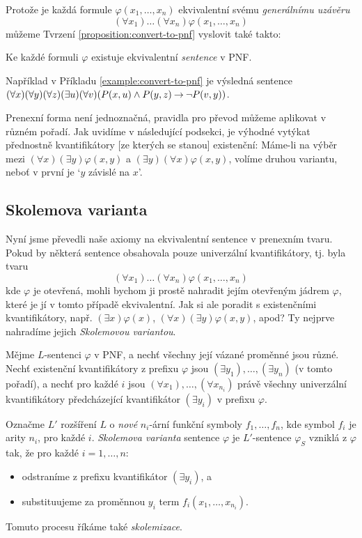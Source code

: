 Protože je každá formule $\varphi(x_1,\dots,x_n)$ ekvivalentní svému \emph{generálnímu uzávěru} $$(\forall x_1)\dots(\forall x_n)\varphi(x_1,\dots,x_n)$$ můžeme Tvrzení \ref{proposition:convert-to-pnf} vyslovit také takto:

\begin{corollary}
    Ke každé formuli $\varphi$ existuje ekvivalentní \emph{sentence} v PNF.
\end{corollary} 

Například v Příkladu \ref{example:convert-to-pnf} je výsledná sentence $(\forall x)(\forall y)(\forall z)(\exists u)(\forall v)( P(x,u)\land P(y,z)\mathbin{\rightarrow}\neg P(v,y))$.

\begin{remark}
    Prenexní forma není jednoznačná, pravidla pro převod můžeme aplikovat v různém pořadí. Jak uvidíme v následující podsekci, je výhodné vytýkat přednostně kvantifikátory [ze kterých se stanou] existenční: Máme-li na výběr mezi $(\forall x)(\exists y)\varphi(x,y)$ a $(\exists y)(\forall x)\varphi(x,y)$, volíme druhou variantu, neboť v první je `$y$ závislé na $x$'.
\end{remark}



\subsection{Skolemova varianta}

Nyní jsme převedli naše axiomy na ekvivalentní sentence v prenexním tvaru. Pokud by některá sentence obsahovala pouze univerzální kvantifikátory, tj. byla tvaru 
$$(\forall x_1)\dots(\forall x_n)\varphi(x_1,\dots,x_n)$$ 
kde $\varphi$ je otevřená, mohli bychom ji prostě nahradit jejím otevřeným jádrem $\varphi$, které je jí v tomto případě ekvivalentní. Jak si ale poradit s existenčními kvantifikátory, např. $(\exists x)\varphi(x)$, $(\forall x)(\exists y)\varphi(x,y)$, apod? Ty nejprve nahradíme jejich \emph{Skolemovou variantou}.

\begin{definition}
Mějme $L$-sentenci $\varphi$ v PNF, a nechť všechny její vázané proměnné jsou různé. Nechť existenční kvantifikátory z prefixu $\varphi$ jsou $(\exists y_1),\dots,(\exists y_n)$ (v tomto pořadí), a nechť pro každé $i$ jsou $(\forall x_1),\dots,(\forall x_{n_i})$ právě všechny univerzální kvantifikátory předcházející kvantifikátor $(\exists y_i)$ v prefixu $\varphi$. 

Označme $L'$ rozšíření $L$ o \emph{nové} $n_i$-ární funkční symboly $f_1,\dots,f_n$, kde symbol $f_i$ je arity $n_i$, pro každé $i$. \emph{Skolemova varianta} sentence $\varphi$ je $L'$-sentence $\varphi_S$ vzniklá z $\varphi$ tak, že pro každé $i=1,\dots,n$:
\begin{itemize}
    \item odstraníme z prefixu kvantifikátor $(\exists y_i)$, a
    \item substituujeme za proměnnou $y_i$ term $f_i(x_1,\dots,x_{n_i})$.
\end{itemize}
Tomuto procesu říkáme také \emph{skolemizace}.
\end{definition}

